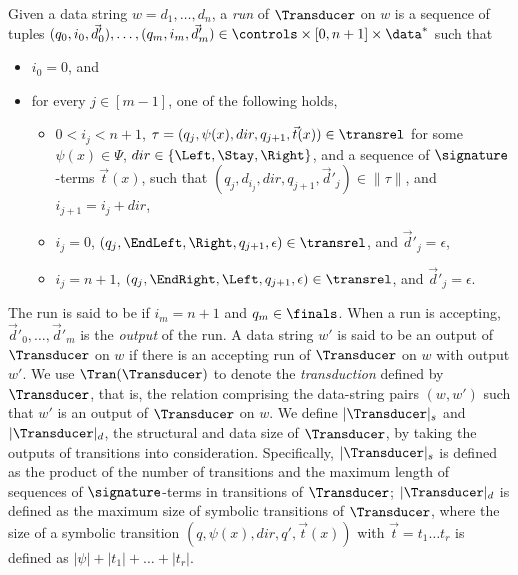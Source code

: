 Given a data string $w = d_1, \dots, d_n$, a \emph{run} of $\Transducer$ on $w$
is a sequence of tuples $(q_0, i_0, \vec{d}'_0), \ldots, (q_m, i_m, \vec{d}'_m) \in \controls \times [0, n+1] \times \data^*$ 
such that
\begin{itemize}
    \item $i_0 = 0$, and
    \item for every $j \in [m-1]$, one of the following holds,
    \begin{itemize}
  	\item  $0< i_j < n+1$, $\tau=(q_j, \psi(x), dir, q_{j+1}, \vec{t}(x)) \in \transrel$ for some $\psi(x) \in \Psi$, $dir \in \{\Left, \Stay, \Right\}$, and a sequence of  $\signature$-terms $\vec{t}(x)$, such that $(q_j, d_{i_j}, dir, q_{j+1}, \vec{d}'_j) \in \|\tau\|$, and $i_{j+1} = i_j + dir$,
	\item $i_j = 0$, $(q_j, \EndLeft, \Right, q_{j+1}, \epsilon) \in \transrel$, and $\vec{d}'_j  = \epsilon$,
	\item $i_j = n+1$, $(q_j, \EndRight, \Left, q_{j+1}, \epsilon) \in \transrel$, and $\vec{d}'_j  = \epsilon$.
  \end{itemize}
\end{itemize}
The run is said to be  if $i_m = n+1$ and $q_m \in \finals$. When a run is accepting, $\vec{d}'_0, \ldots, \vec{d}'_m$ is the \emph{output} of the run.
A data string $w'$ is said to be an output of $\Transducer$ on $w$ if there is an accepting run of
$\Transducer$ on $w$ with output $w'$. We use $\Tran(\Transducer)$ to denote the \emph{transduction} defined by $\Transducer$, that is, the relation comprising the data-string pairs $(w, w')$ such that $w'$ is an output of $\Transducer$ on $w$.
%
We define $|\Transducer|_s$ and $|\Transducer|_d$, the structural and data size of $\Transducer$, by taking the outputs of transitions into consideration. Specifically, $|\Transducer|_s$ is defined as the product of the number of transitions and the maximum length of sequences of $\signature$-terms in  transitions of $\Transducer$; 
$|\Transducer|_d$ is defined as the maximum size of symbolic transitions of $\Transducer$, where the size of a symbolic transition $(q, \psi(x), dir, q', \vec{t}(x))$ with $\vec{t}=t_1 \ldots t_r$ is defined as $|\psi| + |t_1| + \ldots + |t_r|$.


